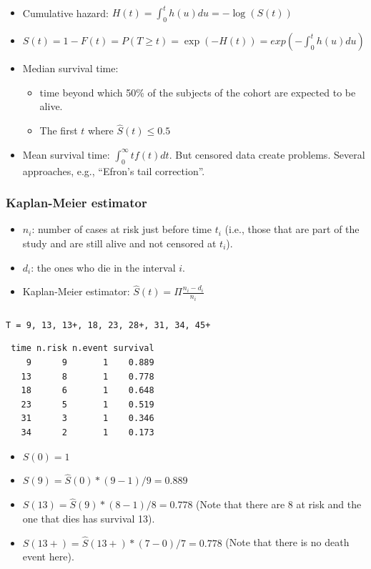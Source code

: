 \begin{frame}
\frametitle{}
\begin{itemize}
\item Cumulative hazard: $H(t) = \int_0^t h(u)du = -\log(S(t))$
\item $S(t) = 1 -F(t) = P(T \ge t) = \exp(-H(t)) = exp(-\int_0^t h(u)du)$
\item Median survival time: 
\begin{itemize}
\item time beyond which 50\% of the subjects of the cohort are expected to
  be alive.
\item The first $t$ where $\hat{S}(t) \le 0.5$
\end{itemize}
\item Mean survival time:  $\int_0^{\infty} t f(t) dt$. But censored data
  create problems. Several approaches, e.g.,
  ``Efron's tail correction''. 
\end{itemize}

\end{frame}



\begin{frame}
\frametitle{Kaplan-Meier estimator}
\begin{itemize}
\item $n_i$: number of cases at risk just before time $t_i$ (i.e.,
  those that are part of the study and are still alive and not censored at
    $t_i$).
\item $d_i$: the ones who die in the interval $i$.
\item Kaplan-Meier estimator: $\hat{S}(t) = \Pi \frac{n_i - d_i}{n_i}$
\end{itemize}
\end{frame}



\begin{frame}[fragile]
\frametitle{}

{\small \verb-T = 9, 13, 13+, 18, 23, 28+, 31, 34, 45+ -

\begin{verbatim}
 time n.risk n.event survival
    9      9       1    0.889
   13      8       1    0.778
   18      6       1    0.648
   23      5       1    0.519
   31      3       1    0.346
   34      2       1    0.173
\end{verbatim}
}


\begin{itemize}

\item $S(0) = 1$
\item $S(9) = \hat{S}(0) * (9 - 1)/9 = 0.889$
\item $S(13) = \hat{S}(9) * (8 - 1)/8 = 0.778$ (Note that there are 8 at
  risk and the one that dies has survival 13).
\item $S(13+) = \hat{S}(13+) * (7 - 0)/7 = 0.778$ (Note that there is no
  death event here).
\end{itemize}
\end{frame}



